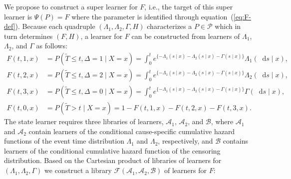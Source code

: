 \documentclass{statsoc}
\numberwithin{theorem}{section}
\newcommand*\diff{\mathop{}\!\mathrm{d}}
\newcommand{\midd}{\; \middle|\;}
\newcommand{\1}{\mathds{1}}
\newcommand{\data}{\ensuremath{\mathcal{D}}}
\begin{document}
We propose to construct a super learner for \( F \), i.e., the target of this
super learner is $\Psi(P) = F$ where the parameter is identified through
equation~(\ref{eq:F-def}). Because each quadruple
$(\Lambda_{1}, \Lambda_{2}, \Gamma, H)$ characterizes a \(P\in\mathcal P\) which
in turn determines \( (F, H) \), a learner for \( F \) can be constructed from
learners of \( \Lambda_1 \), \( \Lambda_2 \), and $\Gamma$ as follows:
\begin{equation}\label{eq:transition}
  \begin{split}
  F(t, 1, x)
  & = P(\tilde{T} \leq t, \Delta=1 \mid X=x)
    = \int_0^t e^{\{-\Lambda_{1}(s \mid x)-\Lambda_{2}(s \mid x) - \Gamma(s \mid x)\} }  \Lambda_{1}(\diff s \mid x),
  \\
  F(t, 2, x)
  & = P(\tilde{T} \leq t, \Delta=2 \mid X=x)
    = \int_0^t e^{\{-\Lambda_{1}(s \mid x)-\Lambda_{2}(s \mid x) - \Gamma(s \mid x)\} }  \Lambda_{2}(\diff s \mid x),
  \\
  F(t, 3, x)
  & =
    P(\tilde{T} \leq t, \Delta=0 \mid X=x)
    = \int_0^t e^{\{-\Lambda_{1}(s \mid x)-\Lambda_{2}(s \mid x) - \Gamma(s \mid x)\} }  \Gamma(\diff s \mid x),
  \\
  F(t, 0, x)
  &
    = P(\tilde{T} > t \mid X= x)
    = 1- F(t, 1, x) - F(t, 2, x)- F(t, 3, x).
  \end{split}
\end{equation}
The state learner requires three libraries of learners, \(\mathcal{A}_1\),
\( \mathcal{A}_2 \), and \( \mathcal{B} \), where \(\mathcal{A}_1\) and
\( \mathcal{A}_2\) contain learners of the conditional cause-specific cumulative
hazard functions of the event time distribution \(\Lambda_1\) and
\( \Lambda_2\), respectively, and \(\mathcal{B}\) contains learners of the
conditional cumulative hazard function of the censoring
distribution. %
Based on the Cartesian product of
libraries of learners for \((\Lambda_1,\Lambda_2,\Gamma)\) we construct a library
$\mathcal{F}(\mathcal{A}_1, \mathcal{A}_2, \mathcal{B})$ of learners
for \( F \):
\end{document}

